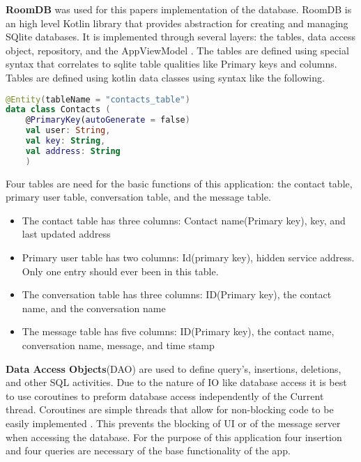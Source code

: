 \documentclass[../main/main.tex]{subfiles}
\begin{document}

\textbf{RoomDB} was used for this papers implementation of the database. 
RoomDB is an high level Kotlin library that provides abstraction for creating and managing SQlite databases. 
It is implemented through several layers: the tables, data access object, repository, and the AppViewModel \cite{ROOM}.
The tables are defined using special syntax that correlates to sqlite table qualities like Primary keys and columns. 
Tables are defined using kotlin data classes using syntax like the following.

\begin{lstlisting}[caption={Example of table definition.}, label={lst:example1}, language=Kotlin]
@Entity(tableName = "contacts_table")
data class Contacts (
    @PrimaryKey(autoGenerate = false)
    val user: String,
    val key: String,
    val address: String
    )
\end{lstlisting}

Four tables are need for the basic functions of this application: the contact table, primary user table, conversation table, and the message table.
\begin{itemize}
\item{The contact table has three columns: Contact name(Primary key), key, and last updated address}
\item{Primary user table has two columns: Id(primary key), hidden service address.
	Only one entry should ever been in this table.	
	}
\item{The conversation table has three columns: ID(Primary key), the contact name, and the conversation name}
\item{The message table has five columns: ID(Primary key), the contact name, conversation name, message, and time stamp}
\end{itemize}

\textbf{Data Access Objects}(DAO) are used to define query's, insertions, deletions, and other SQL activities. 
Due to the nature of IO like database access it is best to use coroutines to preform database access independently of the Current thread. 
Coroutines are simple threads that allow for non-blocking code to be easily implemented \cite{CO}. 
This prevents the blocking of UI or of the message server when accessing the database. 
For the purpose of this application four insertion and four queries are necessary of the base functionality of the app.
\end{document}

